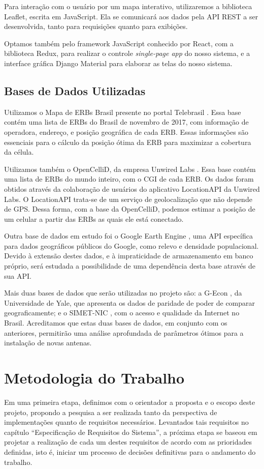 \documentclass[]{politex}
\begin{document}
Para interação com o usuário por um mapa interativo, utilizaremos a biblioteca
Leaflet, escrita em JavaScript. Ela se comunicará aos dados pela API REST a ser
desenvolvida, tanto para requisições quanto para exibições.

Optamos também pelo framework JavaScript conhecido por React, com a biblioteca
Redux, para realizar o controle \emph{single-page app} do nosso sistema, e a
interface gráfica Django Material para elaborar as telas do nosso sistema.

\section{Bases de Dados Utilizadas}
Utilizamos o Mapa de ERBs Brasil presente no portal Telebrasil \cite{mapa-erb}.
Essa base contém uma lista de ERBs do Brasil de novembro de 2017, com
informação de operadora, endereço, e posição geográfica de cada ERB.
Essas informações são essenciais para o cálculo da posição ótima da ERB para
maximizar a cobertura da célula.

Utilizamos também o OpenCelliD, da empresa Unwired Labs \cite{opencellid}.
Essa base contém uma lista de ERBs do mundo inteiro, com o CGI de cada ERB.
Os dados foram obtidos através da colaboração de usuários do aplicativo
LocationAPI da Unwired Labs. O LocationAPI trata-se de um serviço de
geolocalização que não depende de GPS. Dessa forma, com a base da OpenCelliD,
podemos estimar a posição de um celular a partir das ERBs as quais ele está
conectado.

Outra base de dados em estudo foi o Google Earth Engine \cite{earthengine}, uma
API específica para dados geográficos públicos do Google, como relevo e
densidade populacional. Devido à extensão destes dados, e à impraticidade de
armazenamento em banco próprio, será estudada a possibilidade de uma dependência
desta base através de sua API.

Mais duas bases de dados que serão utilizadas no projeto são: a G-Econ
\cite{gecon}, da Universidade de Yale, que apresenta os dados de paridade de
poder de comparar geograficamente; e o SIMET-NIC \cite{simet}, com o acesso e 
qualidade da Internet no Brasil. Acreditamos que estas duas bases de dados, em
conjunto com os anteriores, permitirão uma análise aprofundada de parâmetros
ótimos para a instalação de novas antenas.


\chapter{Metodologia do Trabalho}
Em uma primeira etapa, definimos com o orientador a proposta e o escopo deste
projeto, propondo a pesquisa a ser realizada tanto da perspectiva de
implementações quanto de requisitos necessários. Levantados tais requisitos no
capítulo ``Especificação de Requisitos do Sistema'', a próxima etapa se baseou
em projetar a realização de cada um destes requisitos de acordo com as
prioridades definidas, isto é, iniciar um processo de decisões definitivas para
o andamento do trabalho.
\end{document}
